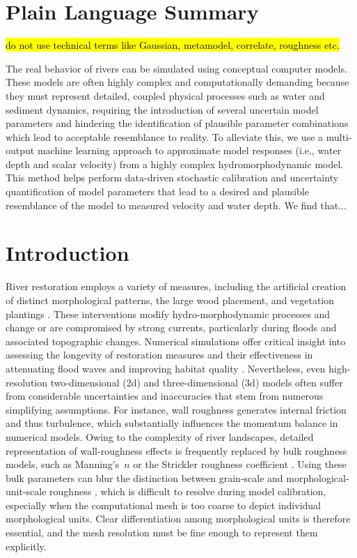 \documentclass[draft,linenumbers,onecolumn]{agujournal2019} %
\begin{document}
\section*{Plain Language Summary}
\hl{do not use technical terms like Gaussian, metamodel, correlate, roughness etc.}

The real behavior of rivers can be simulated using conceptual computer models. These models are often highly complex and computationally demanding because they must represent detailed, coupled physical processes such as water and sediment dynamics, requiring the introduction of several uncertain model parameters and hindering the identification of plausible parameter combinations which lead to acceptable resemblance to reality. To alleviate this, we use a multi-output machine learning approach to approximate model responses (i.e., water depth and scalar velocity) from a highly complex hydromorphodynamic model. This method helps perform data-driven stochastic calibration and uncertainty quantification of model parameters that lead to a desired and plausible resemblance of the model to measured velocity and water depth. We find that...   


\section{Introduction}

River restoration employs a variety of measures, including the artificial creation of distinct morphological patterns, the large wood placement, and vegetation plantings  \cite{schwindt2019hydromorphological, kail2007usea, roni2015wood, grabowski2019current, neuhaus2021engineered}. These interventions modify hydro-morphodynamic processes and change or are compromised by strong currents, particularly during floods and associated topographic changes. Numerical simulations offer critical insight into assessing the longevity of restoration measures and their effectiveness in attenuating flood waves and improving habitat quality \cite{schwindt2020river}. Nevertheless, even high-resolution two-dimensional (2d) and three-dimensional (3d) models often suffer from considerable uncertainties and inaccuracies that stem from numerous simplifying assumptions. For instance, wall roughness generates internal friction and thus turbulence, which substantially influences the momentum balance in numerical models. Owing to the complexity of river landscapes, detailed representation of wall-roughness effects is frequently replaced by bulk roughness models, such as Manning's~$n$ \cite{manning1891flow} or the Strickler roughness coefficient \cite{strickler1923beitrage, meyer-peter1948formulas}. Using these bulk parameters can blur the distinction between grain-scale and morphological-unit-scale roughness \cite{ferguson2007flow}, which is difficult to resolve during model calibration, especially when the computational mesh is too coarse to depict individual morphological units. Clear differentiation among morphological units is therefore essential, and the mesh resolution must be fine enough to represent them explicitly.
\end{document}
